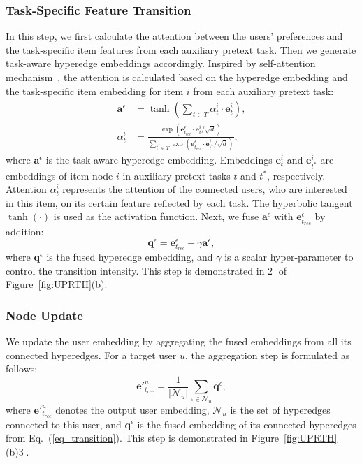 \subsubsection{Task-Specific Feature Transition}
In this step, we first calculate the attention between the users' preferences and the task-specific item features from each auxiliary pretext task. Then we generate task-aware hyperedge embeddings accordingly. Inspired by self-attention mechanism~\cite{transformer}, 
the attention is calculated based on the hyperedge embedding and the task-specific item embedding for item $i$ from each auxiliary pretext task:
\begin{equation}\label{eq_attention}
\begin{aligned}
    \mathbf{a}^{\epsilon} &= \tanh(\sum_{t \in T}\alpha^{i}_{t}\cdot\mathbf{e}^{i}_{t}),\\
    \alpha^{i}_{t} &= \frac{\exp(\mathbf{e}^{\epsilon}_{t_{rec}}\cdot\mathbf{e}^{i}_{t}/\sqrt{d})}
    {\sum_{t^* \in T}\exp(\mathbf{e}^{\epsilon}_{t_{rec}}\cdot\mathbf{e}^{i}_{t^*}/\sqrt{d})},
\end{aligned}
\end{equation}
where $\mathbf{a}^{\epsilon}$ is the task-aware hyperedge embedding. Embeddings $\mathbf{e}^{i}_{t}$ and $\mathbf{e}^{i}_{t^*}$ are embeddings of item node $i$ in auxiliary pretext tasks $t$ and $t^*$, respectively. 
Attention $\alpha^{i}_{t}$ represents the attention of the connected users, who are interested in this item, on its certain feature reflected by each task.
The hyperbolic tangent $\tanh(\cdot)$ is used as the activation function.
Next, we fuse $\mathbf{a}^{\epsilon}$ with $\mathbf{e}^{\epsilon}_{t_{rec}}$ by addition:
\begin{equation}\label{eq_transition}
    \mathbf{q}^{\epsilon} = \mathbf{e}^{\epsilon}_{t_{rec}} + \gamma\mathbf{a}^{\epsilon},
\end{equation}
where $\mathbf{q}^{\epsilon}$ is the fused hyperedge embedding, and $\gamma$ is a scalar hyper-parameter to control the transition intensity. This step is demonstrated in \textcircled{2} of Figure~\ref{fig:UPRTH}(b).  

\subsubsection{Node Update} We update the user embedding by aggregating the fused embeddings from all its connected hyperedges.
For a target user $u$, the aggregation step is formulated as follows:
\begin{equation}\label{eq_update}
    \mathbf{e'}^{u}_{t_{rec}}= \frac{1}{|\mathcal{N}_u|}\sum_{\epsilon\in\mathcal{N}_u}\mathbf{q}^{\epsilon},
\end{equation}
where $\mathbf{e'}^{u}_{t_{rec}}$ denotes the output user embedding, $\mathcal{N}_u$ is the set of hyperedges connected to this user, and $\mathbf{q}^{\epsilon}$ is the fused embedding of its connected hyperedges from Eq.~(\ref{eq_transition}).
This step is demonstrated in Figure~\ref{fig:UPRTH}(b)\textcircled{3}.

